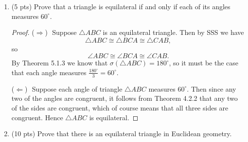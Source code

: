 \documentclass[12pt]{article}
\newcommand{\ray}[1]{\overrightarrow{#1}}
\renewcommand{\line}[1]{\stackrel{\longleftrightarrow}{#1}}
\newcommand{\seg}[1]{\overline{#1}}
\newcommand{\forward}{\noindent ($\Longrightarrow$) \,\,}
\newcommand{\back}{\noindent ($\Longleftarrow$) \,\,}
\renewcommand{\o}{\circ}
\begin{document}
\begin{enumerate}
\begin{proof}
Because $P$ is in the interior of $\angle ABD$ and $Q$ is in the interior of $\angle DBC$, we have $P$ and $A$ on the same side of $\line{DB}$, and $Q$ and $C$ on the same side of $\line{DB}$. However since $A\ast B\ast C$, we see that $A$ and $C$ are on opposite sides of the line $\line{DB}$ and therefore $P$ and $Q$ are on opposite sides of $\line{DB}$. Hence the line $\line{DB}$ intersects the interior of $\seg{PQ}$ at a point $G$. However, from the fact that $P$ is in the interior of angle $\angle ABD$ and $Q$ is in the interior of angle $\angle DBC$, we also infer that $P,Q,$ and $D$ are all on the same side of line $\line{AB}=\line{BC}$. Thus by convexity of the half-plane, since $G\in\seg{PQ}$ it must be the case that $G$ is on the same side of $\line{AB}$ as $D$ as well. Hence $\seg{PQ}$ intersects the ray $\ray{AD}$ at $G$, and by Theorem 3.5.3 we finally conclude that $D$ is in the interior of angle $\angle PBQ.$ Therefore
\begin{align*} \mu(\angle PBQ) &= \mu(\angle PBD) + \mu(\angle DBQ)\\
						&=x^\o + y^\o\\
						&= 90^\o,
\end{align*}  so $\angle PBQ$ is a right angle.
\end{proof}

\item (5 pts) Prove that a triangle is equilateral if and only if each of its angles measures $60^{\circ}$. 

\begin{proof} \forward Suppose $\triangle ABC$ is an equilateral triangle. Then by SSS we have $$\triangle ABC \cong \triangle BCA \cong \triangle CAB,$$ so $$\angle ABC \cong \angle BCA \cong \angle CAB.$$ By Theorem 5.1.3 we know that $\sigma(\triangle ABC) = 180^\o$, so it must be the case that each angle measures $\frac{180^\o}{3} = 60^\o.$

\back Suppose each angle of triangle $\triangle ABC$ measures $60^\o$. Then since any two of the angles are congruent, it follows from Theorem 4.2.2 that any two of the sides are congruent, which of course means that all three sides are congruent. Hence $\triangle ABC$ is equilateral. \end{proof}
 
\item (10 pts) Prove that there is an equilateral triangle in Euclidean geometry.


\end{enumerate}
\end{document}
